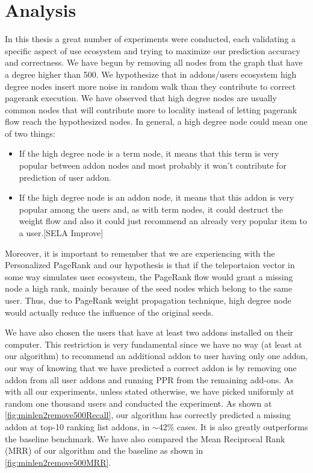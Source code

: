 \documentclass[11pt,oneside]{book}
\let\Oldsection\section
\renewcommand{\section}{\FloatBarrier\Oldsection}
\begin{document}
\section{Analysis}

In this thesis a great number of experiments were conducted, each validating a specific aspect of use ecosystem and trying to maximize our prediction accuracy and correctness. We have begun by removing all nodes from the graph that have a degree higher than 500. We hypothesize that in addons/users ecosystem high degree nodes insert more noise in random walk than they contribute to correct pagerank execution. We have observed that high degree nodes are usually common nodes that will contribute more to locality instead of letting pagerank flow reach the hypothesized nodes. In general, a high degree node could mean one of two things:
\begin{itemize}
\renewcommand{\labelitemiii}{$\diamond$}
\item If the high degree node is a term node, it means that this term is very popular between addon nodes and most probably it won't contribute for prediction of user addon.
\item If the high degree node is an addon node, it means that this addon is very popular among the users and, as with term nodes, it could destruct the weight flow and also it could just recommend an already very popular item to a user.[SELA Improve]
\end{itemize}
Moreover, it is important to remember that we are experiencing with the Personalized PageRank and our hypothesis is that if the teleportaion vector in some way simulates user ecosystem, the PageRank flow would grant a missing node a high rank, mainly because of the seed nodes which belong to the same user. Thus, due to PageRank weight propagation technique, high degree node would actually reduce the influence of the original seeds.

We have also chosen the users that have at least two addons installed on their computer. This restriction is very fundamental since we have no way (at least at our algorithm) to recommend an additional addon to user having only one addon, our way of knowing that we have predicted a correct addon is by removing one addon from all user addons and running PPR from the remaining add-ons. As with all our experiments, unless stated otherwise, we have picked uniformly at random one thousand users and conducted the experiment. As shown at \autoref{fig:minlen2remove500Recall}, our algorithm has correctly predicted a missing addon at top-10 ranking list addons, in {$\sim$}42\% cases. It is also greatly outperforms the baseline benchmark. We have also compared the Mean Reciprocal Rank (MRR) of our algorithm and the baseline as shown in \autoref{fig:minlen2remove500MRR}.
\end{document}
